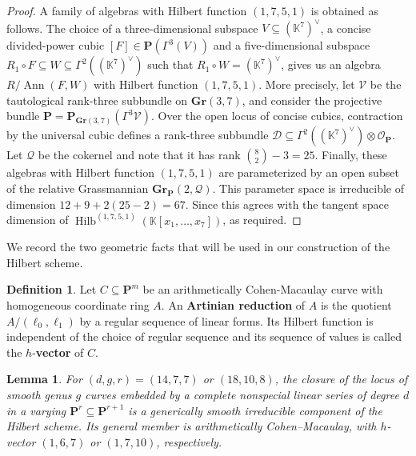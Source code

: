 \documentclass[leqno,11pt,a4paper]{amsart}
\newtheorem{lemma}[lemma]{Lemma}
\theoremstyle{definition}
\newtheorem{definition}[definition]{Definition}
\numberwithin{equation}{section}
\newcommand{\Gr}{\mathbf{Gr}}
\newcommand{\kk}{\mathbb{K}}
\newcommand{\PP}{\mathbf{P}}
\newcommand{\OO}{\mathscr{O}}
\DeclareMathOperator{\Hilb}{Hilb}
\DeclareMathOperator{\Ann}{Ann}
\begin{document}
\begin{proof}
A family of algebras with Hilbert function $(1,7,5,1)$ is obtained as follows.
The choice of a three-dimensional subspace $V \subseteq (\kk^7)^\vee$, a concise divided-power cubic $[F]\in\PP(\Gamma^3(V))$ and a five-dimensional subspace $R_1\circ F \subseteq W \subseteq \Gamma^2((\kk^7)^\vee)$ such that $R_1\circ W=(\kk^7)^\vee$, gives us an algebra $R/\Ann(F,W)$ with Hilbert function $(1,7,5,1)$.
More precisely, let $\mathscr{V}$ be the tautological rank-three subbundle on $\Gr(3,7)$, and consider
the projective bundle $\PP = \PP_{\Gr(3,7)}(\Gamma^3\mathscr{V}).$
Over the open locus of concise cubics, contraction by the universal cubic defines a rank-three subbundle
$\mathscr{D} \subseteq \Gamma^2((\kk^7)^\vee) \otimes \OO_\PP$. Let $\mathscr{Q}$ be the cokernel and note that it has rank $\binom{8}{2}-3 = 25$. 
Finally, these algebras with Hilbert function $(1,7,5,1)$ are parameterized by an open subset of the relative Grassmannian $\Gr_{\PP}(2,\mathscr{Q})$. 
This parameter space is irreducible of dimension $12+9+2(25-2)=67$. 
Since this agrees with the tangent space dimension of $\Hilb^{(1,7,5,1)}(\kk[x_1,\dots,x_7])$, as required.
\end{proof}



We record the two geometric facts that will be used in our construction of the Hilbert scheme.

\begin{definition}
Let $C \subseteq \PP^m$ be an arithmetically Cohen-Macaulay curve with homogeneous coordinate ring $A$.
An \textbf{Artinian reduction} of $A$ is the quotient $A/(\ell_0,\ell_1)$ by a regular sequence of linear forms.
Its Hilbert function is independent of the choice of regular sequence and its sequence of values is called the $h$-\textbf{vector} of $C$.
\end{definition}

\begin{lemma}\label{non_special}
For $(d,g,r)=(14,7,7)$ or $(18,10,8)$, the closure of the locus of smooth genus $g$ curves embedded by a complete nonspecial linear series of degree $d$ in a varying $\PP^r\subseteq\PP^{r+1}$ is a generically smooth irreducible component of the Hilbert scheme.
Its general member is arithmetically Cohen--Macaulay, with $h$-vector $(1,6,7)$ or $(1,7,10)$, respectively.
\end{lemma}
\end{document}
